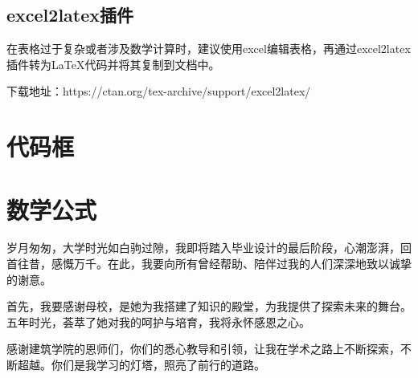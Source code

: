 \documentclass[AutoFakeBold]{ZafuThesis}
\begin{document}
\subsection{excel2latex插件}
在表格过于复杂或者涉及数学计算时，建议使用excel编辑表格，再通过excel2latex插件转为\LaTeX 代码并将其复制到文档中。
\par
下载地址：https://ctan.org/tex-archive/support/excel2latex/

\section{代码框}

\section{数学公式}


% 
% 

\Thanks
{
  岁月匆匆，大学时光如白驹过隙，我即将踏入毕业设计的最后阶段，心潮澎湃，回首往昔，感慨万千。在此，我要向所有曾经帮助、陪伴过我的人们深深地致以诚挚的谢意。\par
  首先，我要感谢母校，是她为我搭建了知识的殿堂，为我提供了探索未来的舞台。五年时光，荟萃了她对我的呵护与培育，我将永怀感恩之心。\par
  感谢建筑学院的恩师们，你们的悉心教导和引领，让我在学术之路上不断探索，不断超越。你们是我学习的灯塔，照亮了前行的道路。
}
\end{document}
